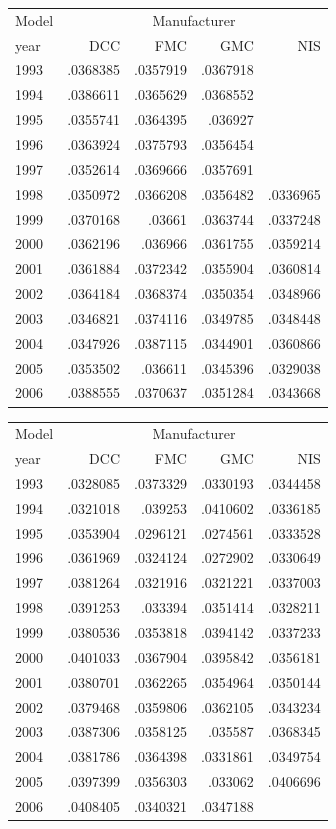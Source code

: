 \begin{tabular}{lrrrr}
\toprule
Model & \multicolumn{4}{c}{Manufacturer} \\
year & DCC & FMC & GMC & NIS \\
\midrule
1993 & .0368385 & .0357919 & .0367918 &  \\
1994 & .0386611 & .0365629 & .0368552 &  \\
1995 & .0355741 & .0364395 & .036927 &  \\
1996 & .0363924 & .0375793 & .0356454 &  \\
1997 & .0352614 & .0369666 & .0357691 &  \\
1998 & .0350972 & .0366208 & .0356482 & .0336965 \\
1999 & .0370168 & .03661 & .0363744 & .0337248 \\
2000 & .0362196 & .036966 & .0361755 & .0359214 \\
2001 & .0361884 & .0372342 & .0355904 & .0360814 \\
2002 & .0364184 & .0368374 & .0350354 & .0348966 \\
2003 & .0346821 & .0374116 & .0349785 & .0348448 \\
2004 & .0347926 & .0387115 & .0344901 & .0360866 \\
2005 & .0353502 & .036611 & .0345396 & .0329038 \\
2006 & .0388555 & .0370637 & .0351284 & .0343668 \\
\bottomrule
\end{tabular}

\begin{tabular}{lrrrr}
\toprule
Model & \multicolumn{4}{c}{Manufacturer} \\
year & DCC & FMC & GMC & NIS \\
\midrule
1993 & .0328085 & .0373329 & .0330193 & .0344458 \\
1994 & .0321018 & .039253 & .0410602 & .0336185 \\
1995 & .0353904 & .0296121 & .0274561 & .0333528 \\
1996 & .0361969 & .0324124 & .0272902 & .0330649 \\
1997 & .0381264 & .0321916 & .0321221 & .0337003 \\
1998 & .0391253 & .033394 & .0351414 & .0328211 \\
1999 & .0380536 & .0353818 & .0394142 & .0337233 \\
2000 & .0401033 & .0367904 & .0395842 & .0356181 \\
2001 & .0380701 & .0362265 & .0354964 & .0350144 \\
2002 & .0379468 & .0359806 & .0362105 & .0343234 \\
2003 & .0387306 & .0358125 & .035587 & .0368345 \\
2004 & .0381786 & .0364398 & .0331861 & .0349754 \\
2005 & .0397399 & .0356303 & .033062 & .0406696 \\
2006 & .0408405 & .0340321 & .0347188 &  \\
\bottomrule
\end{tabular}

